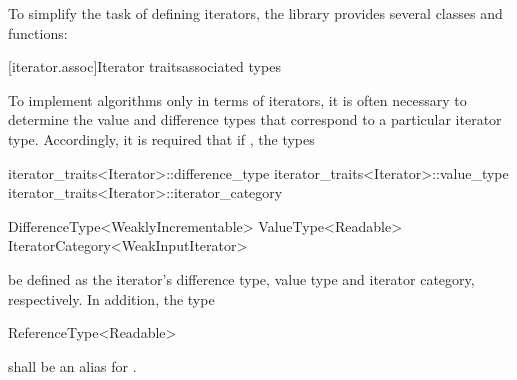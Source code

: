 \pnum
To simplify the task of defining iterators, the library provides
several classes and functions:

[iterator.assoc]{Iterator \textcolor{remclr}{traits}\textcolor{addclr}{associated types}}

\pnum
To implement algorithms only in terms of iterators, it is often necessary to
determine the value and
difference types that correspond to a particular iterator type.
Accordingly, it is required that if
, the types

\begin{removedblock}
\begin{codeblock}
iterator_traits<Iterator>::difference_type
iterator_traits<Iterator>::value_type
iterator_traits<Iterator>::iterator_category
\end{codeblock}
\end{removedblock}
\begin{addedblock}
\begin{codeblock}
DifferenceType<WeaklyIncrementable>
ValueType<Readable>
IteratorCategory<WeakInputIterator>
\end{codeblock}
\end{addedblock}

be defined as the iterator's difference type, value type and iterator category, respectively.
In addition, the type

\begin{addedblock}
\begin{codeblock}
ReferenceType<Readable>
\end{codeblock}

shall be an alias for .
\end{addedblock}

